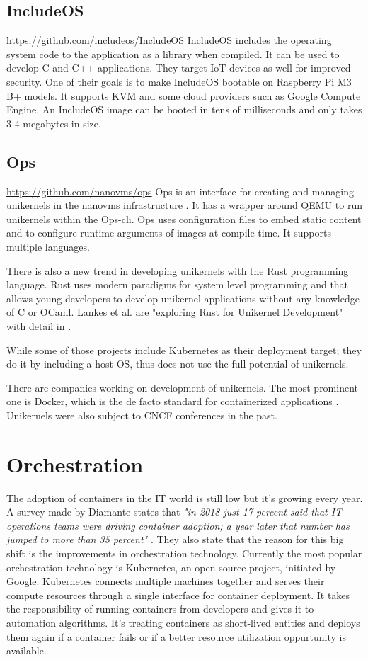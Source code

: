 \subsection*{IncludeOS}
\url{https://github.com/includeos/IncludeOS} \cite{7396164}
IncludeOS includes the operating system code to the application as a library when compiled. It can be used to develop C and C++ applications. They target IoT devices as well for improved security. One of their goals is to make IncludeOS bootable on Raspberry Pi M3 B+ models. It supports KVM and some cloud providers such as Google Compute Engine. An IncludeOS image can be booted in tens of milliseconds and only takes 3-4 megabytes in size.

\subsection*{Ops}
\url{https://github.com/nanovms/ops}
  Ops is an interface for creating and managing unikernels in the nanovms infrastructure \cite{nanovms}. It has a wrapper around QEMU \cite{qemu} to run unikernels within the Ops-cli. Ops uses configuration files to embed static content and to configure runtime arguments of images at compile time. It supports multiple languages.
\newline


There is also a new trend in developing unikernels with the Rust programming language. Rust uses modern paradigms for system level programming and that allows young developers to develop unikernel applications without any knowledge of C or OCaml. Lankes et al. are "exploring Rust for Unikernel Development" with detail in \cite{Lankes2019}.

While some of those projects include Kubernetes as their deployment target; they do it by including a host OS, thus does not use the full potential of unikernels.

There are companies working on development of unikernels. The most prominent one is Docker, which is the de facto standard for containerized applications \cite{francia_2016}. Unikernels were also subject to CNCF conferences in the past.

\section{Orchestration}
The adoption of containers in the IT world is still low but it's growing every year. A survey made by Diamante states that \textit{"in 2018 just 17 percent said that IT operations teams were driving container adoption; a year later that number has jumped to more than 35 percent"} \cite{diamante}. They also state that the reason for this big shift is the improvements in orchestration technology. Currently the most popular orchestration technology is Kubernetes, an open source project, initiated by Google. Kubernetes connects multiple machines together and serves their compute resources through a single interface for container deployment. It takes the responsibility of running containers from developers and gives it to automation algorithms. It's treating containers as short-lived entities and deploys them again if a container fails or if a better resource utilization oppurtunity is available.

